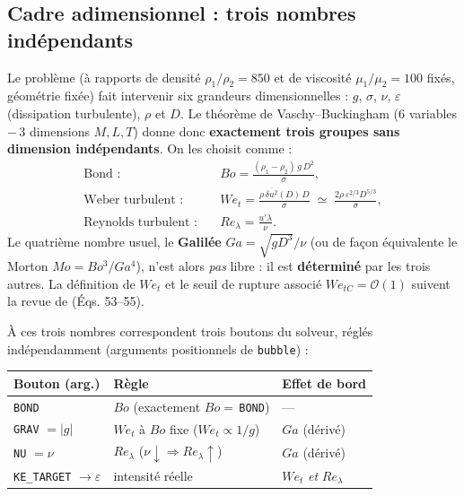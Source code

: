 \subsection{Cadre adimensionnel : trois nombres indépendants}

Le problème (à rapports de densité $\rho_1/\rho_2=850$ et de viscosité
$\mu_1/\mu_2=100$ fixés, géométrie fixée) fait intervenir six grandeurs
dimensionnelles : $g$, $\sigma$, $\nu$, $\varepsilon$ (dissipation turbulente),
$\rho$ et $D$. Le théorème de Vaschy--Buckingham ($6$ variables $-\,3$ dimensions
$M,L,T$) donne donc \textbf{exactement trois groupes sans dimension
indépendants}. On les choisit comme :
\begin{align}
    \text{Bond :}    \quad & Bo = \frac{(\rho_1-\rho_2)\,g\,D^2}{\sigma}, \\
    \text{Weber turbulent :} \quad & We_t = \frac{\rho\,\overline{\delta u^2}(D)\,D}{\sigma}
        \;\simeq\; \frac{2\rho\,\varepsilon^{2/3} D^{5/3}}{\sigma}, \\
    \text{Reynolds turbulent :} \quad & Re_\lambda = \frac{u'\lambda}{\nu}.
\end{align}
Le quatrième nombre usuel, le \textbf{Galilée} $Ga = \sqrt{g D^3}/\nu$ (ou de façon
équivalente le Morton $Mo = Bo^3/Ga^4$), n'est alors \emph{pas} libre : il est
\textbf{déterminé} par les trois autres. La définition de $We_t$ et le seuil de
rupture associé $We_{tC}=\mathcal{O}(1)$ suivent la revue de
\cite{legendre2025} (Éqs. 53--55).

À ces trois nombres correspondent trois boutons du solveur, réglés
indépendamment (arguments positionnels de \texttt{bubble}) :
\begin{center}
\renewcommand{\arraystretch}{1.3}
\begin{tabular}{lll}
    \toprule
    Bouton (arg.) & Règle & Effet de bord \\
    \midrule
    \texttt{BOND} & $Bo$ (exactement $Bo=$\,\texttt{BOND}) & --- \\
    \texttt{GRAV} $=|g|$ & $We_t$ à $Bo$ fixe ($We_t\propto 1/g$) & $Ga$ (dérivé) \\
    \texttt{NU} $=\nu$ & $Re_\lambda$ ($\nu\!\downarrow\Rightarrow Re_\lambda\!\uparrow$) & $Ga$ (dérivé) \\
    \texttt{KE\_TARGET} $\to\varepsilon$ & intensité réelle & $We_t$ \emph{et} $Re_\lambda$ \\
    \bottomrule
\end{tabular}
\end{center}

